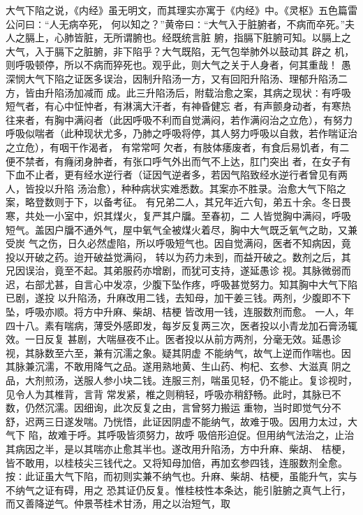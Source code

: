 \documentclass[a4paper,12pt,UTF8,twoside]{ctexbook}
\begin{document}
大气下陷之说，《内经》虽无明文，而其理实亦寓于《内经》中。《灵枢》五色篇雷公问曰∶“人无病卒死， 
何以知之？”黄帝曰∶“大气入于脏腑者，不病而卒死。”夫人之膈上，心肺皆脏，无所谓腑也。经既统言脏 
腑，指膈下脏腑可知。以膈上之大气，入于膈下之脏腑，非下陷乎？大气既陷，无气包举肺外以鼓动其 辟之 
机，则呼吸顿停，所以不病而猝死也。观乎此，则大气之关于人身者，何其重哉！ 
愚深悯大气下陷之证医多误治，因制升陷汤一方，又有回阳升陷汤、理郁升陷汤二方，皆由升陷汤加减而 
成。此三升陷汤后，附载治愈之案，其病之现状∶有呼吸短气者，有心中怔忡者，有淋漓大汗者，有神昏健忘 
者，有声颤身动者，有寒热往来者，有胸中满闷者（此因呼吸不利而自觉满闷，若作满闷治之立危），有努力 
呼吸似喘者（此种现状尤多，乃肺之呼吸将停，其人努力呼吸以自救，若作喘证治之立危），有咽干作渴者， 
有常常呵 
欠者，有肢体痿废者，有食后易饥者，有二便不禁者，有癃闭身肿者，有张口呼气外出而气不上达，肛门突出 
者，在女子有下血不止者，更有经水逆行者（证因气逆者多，若因气陷致经水逆行者曾见有两人，皆投以升陷 
汤治愈），种种病状实难悉数。其案亦不胜录。治愈大气下陷之案，略登数则于下，以备考征。 
有兄弟二人，其兄年近六旬，弟五十余。冬日畏寒，共处一小室中，炽其煤火，复严其户牖。至春初，二 
人皆觉胸中满闷，呼吸短气。盖因户牖不通外气，屋中氧气全被煤火着尽，胸中大气既乏氧气之助，又兼受炭 
气之伤，日久必然虚陷，所以呼吸短气也。因自觉满闷，医者不知病因，竟投以开破之药。迨开破益觉满闷， 
转以为药力未到，而益开破之。数剂之后，其兄因误治，竟至不起。其弟服药亦增剧，而犹可支持，遂延愚诊 
视。其脉微弱而迟，右部尤甚，自言心中发凉，少腹下坠作疼，呼吸甚觉努力。知其胸中大气下陷已剧，遂投 
以升陷汤，升麻改用二钱，去知母，加干姜三钱。两剂，少腹即不下坠，呼吸亦顺。将方中升麻、柴胡、桔梗 
皆改用一钱，连服数剂而愈。 
一人，年四十八。素有喘病，薄受外感即发，每岁反复两三次，医者投以小青龙加石膏汤辄效。一日反复 
甚剧，大喘昼夜不止。医者投以从前方两剂，分毫无效。延愚诊视，其脉数至六至，兼有沉濡之象。疑其阴虚 
不能纳气，故气上逆而作喘也。因其脉兼沉濡，不敢用降气之品。遂用熟地黄、生山药、枸杞、玄参、大滋真 
阴之品，大剂煎汤，送服人参小块二钱。连服三剂，喘虽见轻，仍不能止。复诊视时，见令人为其椎背，言背 
常发紧，椎之则稍轻，呼吸亦稍舒畅。此时，其脉已不数，仍然沉濡。因细询，此次反复之由，言曾努力搬运 
重物，当时即觉气分不舒，迟两三日遂发喘。乃恍悟，此证因阴虚不能纳气，故难于吸。因用力太过，大气下 
陷，故难于呼。其呼吸皆须努力，故呼 
吸倍形迫促。但用纳气法治之，止治其病因之半，是以其喘亦止愈其半也。遂改用升陷汤，方中升麻、柴胡、 
桔梗，皆不敢用，以桂枝尖三钱代之。又将知母加倍，再加玄参四钱，连服数剂全愈。 
按∶此证虽大气下陷，而初则实兼不纳气也。升麻、柴胡、桔梗，虽能升气，实与不纳气之证有碍，用之 
恐其证仍反复。惟桂枝性本条达，能引脏腑之真气上行，而又善降逆气。仲景苓桂术甘汤，用之以治短气，取 
\end{document}
